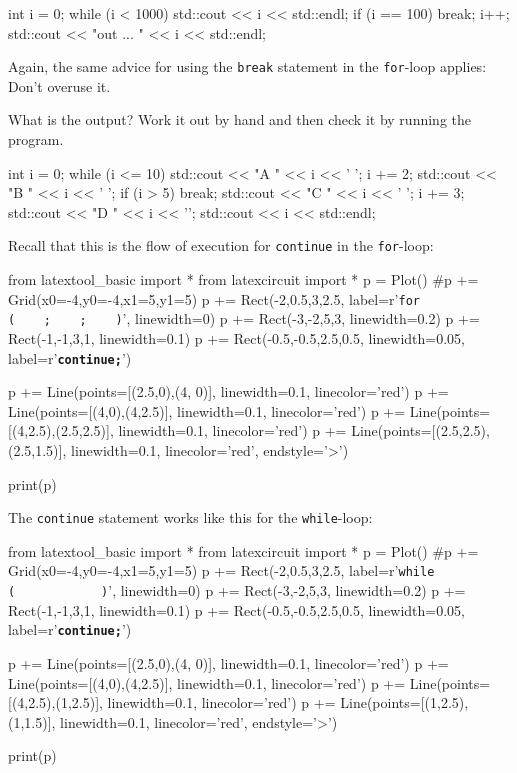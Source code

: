 \begin{console}
int i = 0;
while (i < 1000)
{     
      std::cout << i << std::endl;
      if (i == 100) break;
      i++;
}
std::cout << "out ... " << i << std::endl;
\end{console}

Again, the same advice for using the \texttt{break} statement in the
\texttt{for}-loop applies: Don't overuse it.

\begin{ex}
What is the output? Work it out by hand and then
check it by running the program.
\begin{console}
int i = 0;
while (i <= 10)
{     
      std::cout << "A " << i << ' ';
      i += 2;
      std::cout << "B " << i << ' ';
      if (i > 5) break;
      std::cout << "C " << i << ' ';
      i += 3;
      std::cout << "D " << i << '\n';
}
std::cout << i << std::endl;
\end{console}
\end{ex}

\newpage{}

Recall that this is the flow of execution for \texttt{continue} in the \texttt{for}-loop:
\begin{python}
from latextool_basic import *
from latexcircuit import *
p = Plot()
#p += Grid(x0=-4,y0=-4,x1=5,y1=5)
p += Rect(-2,0.5,3,2.5, label=r'\large{\texttt{for  (\ \ \ \ ;\ \ \ \ ;\ \ \ \ )}}', linewidth=0)
p += Rect(-3,-2,5,3, linewidth=0.2)
p += Rect(-1,-1,3,1, linewidth=0.1)
p += Rect(-0.5,-0.5,2.5,0.5, linewidth=0.05, label=r'\texttt{\textbf{continue;}}')


p += Line(points=[(2.5,0),(4, 0)], linewidth=0.1, linecolor='red')
p += Line(points=[(4,0),(4,2.5)], linewidth=0.1, linecolor='red')
p += Line(points=[(4,2.5),(2.5,2.5)], linewidth=0.1, linecolor='red')
p += Line(points=[(2.5,2.5),(2.5,1.5)], linewidth=0.1, linecolor='red', endstyle='>')

print(p)
\end{python}
The \texttt{continue} statement works like this for the \texttt{while}-loop:
\begin{python}
from latextool_basic import *
from latexcircuit import *
p = Plot()
#p += Grid(x0=-4,y0=-4,x1=5,y1=5)
p += Rect(-2,0.5,3,2.5, label=r'\large{\texttt{while  (\ \ \ \ \ \ \ \ \ \ \ \ )}}', linewidth=0)
p += Rect(-3,-2,5,3, linewidth=0.2)
p += Rect(-1,-1,3,1, linewidth=0.1)
p += Rect(-0.5,-0.5,2.5,0.5, linewidth=0.05, label=r'\texttt{\textbf{continue;}}')


p += Line(points=[(2.5,0),(4, 0)], linewidth=0.1, linecolor='red')
p += Line(points=[(4,0),(4,2.5)], linewidth=0.1, linecolor='red')
p += Line(points=[(4,2.5),(1,2.5)], linewidth=0.1, linecolor='red')
p += Line(points=[(1,2.5),(1,1.5)], linewidth=0.1, linecolor='red', endstyle='>')

print(p)
\end{python}

